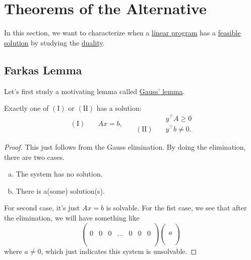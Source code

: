 \section{Theorems of the Alternative}
In this section, we want to characterize when a \hyperref[def:general-linear-programming-problem]{linear program} has a \hyperref[def:feasible-solution]{feasible solution} by studying the \hyperref[def:dual]{duality}.

\subsection{Farkas Lemma}
Let's first study a motivating lemma called \hyperref[lma:Gauss]{Gauss' lemma}.

\begin{lemma}\label{lma:Gauss}
	Exactly one of \((\mathrm{I})\) or \((\mathrm{II})\) has a solution:
	\[
		\begin{aligned}
			(\mathrm{I})\quad & Ax = b,
		\end{aligned}\quad
		\begin{aligned}
			                   & y^{\top}A\geq 0   \\
			(\mathrm{II})\quad & y^{\top}b\neq  0.
		\end{aligned}
	\]
\end{lemma}
\begin{proof}
	This just follows from the Gauss elimination. By doing the elimination, there are two cases.
	\begin{enumerate}[(a)]
		\item The system has no solution.
		\item There is a(some) solution(s).
	\end{enumerate}

	For second case, it's just \(Ax = b\) is solvable.  For the fist case, we see that after the elimination, we will have something like
	\[
		\begin{pmatrix}
			  &   &   &       &   &   &   \\
			  &   &   &       &   &   &   \\
			0 & 0 & 0 & \dots & 0 & 0 & 0 \\
			  &   &   &       &   &   &   \\
			  &   &   &       &   &   &   \\
		\end{pmatrix}
		\begin{pmatrix}
			\\
			\\
			a \\
			\\
			\\
		\end{pmatrix}
	\]
	where \(a\neq 0\), which just indicates this system is unsolvable.
\end{proof}

